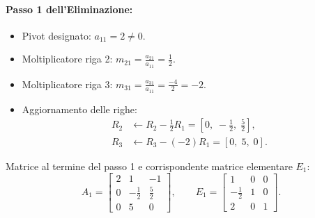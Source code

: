 \paragraph{Passo 1 dell'Eliminazione:}
\begin{itemize}
    \item Pivot designato: $a_{11} = 2 \neq 0$.
    \item Moltiplicatore riga 2: $m_{21} = \frac{a_{21}}{a_{11}} = \frac{1}{2}$.
    \item Moltiplicatore riga 3: $m_{31} = \frac{a_{31}}{a_{11}} = \frac{-4}{2} = -2$.
    \item Aggiornamento delle righe:
    \begin{align}
        R_2 &\leftarrow R_2 - \tfrac{1}{2} R_1 = \left[0, \; -\tfrac{1}{2}, \; \tfrac{5}{2}\right], \\
        R_3 &\leftarrow R_3 - (-2) R_1 = [0, \; 5, \; 0].
    \end{align}
\end{itemize}
Matrice al termine del passo 1 e corrispondente matrice elementare $E_1$:
\begin{equation}
    A_1 = \begin{bmatrix}
        2 & 1 & -1 \\
        0 & -\frac{1}{2} & \frac{5}{2} \\
        0 & 5 & 0
    \end{bmatrix}, \qquad
    E_1 = \begin{bmatrix}
        1 & 0 & 0 \\
        -\frac{1}{2} & 1 & 0 \\
        2 & 0 & 1
    \end{bmatrix}.
\end{equation}

